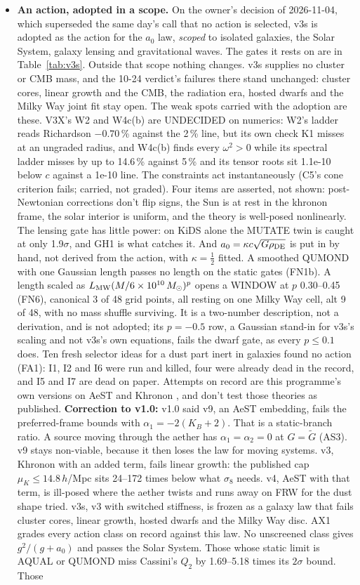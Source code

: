 \documentclass[10pt]{article}
\begin{document}
\begin{itemize}
\item \textbf{An action, adopted in a scope.} On the owner's decision of 2026-11-04, which superseded the same day's call that no action is selected, v3s is adopted as the action for the $a_0$ law, \emph{scoped} to isolated galaxies, the Solar System, galaxy lensing and gravitational waves. The gates it rests on are in Table~\ref{tab:v3s}. Outside that scope nothing changes. v3s supplies no cluster or CMB mass, and the 10-24 verdict's failures there stand unchanged: cluster cores, linear growth and the CMB, the radiation era, hosted dwarfs and the Milky Way joint fit stay open. The weak spots carried with the adoption are these. V3X's W2 and W4c(b) are UNDECIDED on numerics: W2's ladder reads Richardson $-0.70$\,\% against the 2\,\% line, but its own check K1 misses at an ungraded radius, and W4c(b) finds every $\omega^2>0$ while its spectral ladder misses by up to 14.6\,\% against 5\,\% and its tensor roots sit 1.1e-10 below $c$ against a 1e-10 line. The constraints act instantaneously (C5's cone criterion fails; carried, not graded). Four items are asserted, not shown: post-Newtonian corrections don't flip signs, the Sun is at rest in the khronon frame, the solar interior is uniform, and the theory is well-posed nonlinearly. The lensing gate has little power: on KiDS alone the MUTATE twin is caught at only 1.9$\sigma$, and GH1 is what catches it. And $a_0=\kappa c\sqrt{G\rho_{\rm DE}}$ is put in by hand, not derived from the action, with $\kappa=\tfrac12$ fitted. A smoothed QUMOND with one Gaussian length passes no length on the static gates (FN1b). A length scaled as $L_{\rm MW}(M/6\times10^{10}\,M_\odot)^p$ opens a WINDOW at $p$ 0.30--0.45 (FN6), canonical 3 of 48 grid points, all resting on one Milky Way cell, alt 9 of 48, with no mass shuffle surviving. It is a two-number description, not a derivation, and is not adopted; its $p=-0.5$ row, a Gaussian stand-in for v3s's scaling and not v3s's own equations, fails the dwarf gate, as every $p\le0.1$ does. Ten fresh selector ideas for a dust part inert in galaxies found no action (FA1): I1, I2 and I6 were run and killed, four were already dead in the record, and I5 and I7 are dead on paper. Attempts on record are this programme's own versions on AeST \cite{SZ} and Khronon \cite{BS}, and don't test those theories as published. \textbf{Correction to v1.0:} v1.0 said v9, an AeST embedding, fails the preferred-frame bounds with $\alpha_1=-2(K_B+2)$. That is a static-branch ratio. A source moving through the aether has $\alpha_1=\alpha_2=0$ at $G=\tilde G$ (AS3). v9 stays non-viable, because it then loses the law for moving systems. v3, Khronon with an added term, fails linear growth: the published cap $\mu_K\le14.8\,h$/Mpc sits 24--172 times below what $\sigma_8$ needs. v4, AeST with that term, is ill-posed where the aether twists and runs away on FRW for the dust shape tried. v3s, v3 with switched stiffness, is frozen as a galaxy law that fails cluster cores, linear growth, hosted dwarfs and the Milky Way disc. AX1 grades every action class on record against this law. No unscreened class gives $g^2/(g+a_0)$ and passes the Solar System. Those whose static limit is AQUAL or QUMOND miss Cassini's $Q_2$ by 1.69--5.18 times its $2\sigma$ bound. Those 
\end{itemize}
\end{document}
